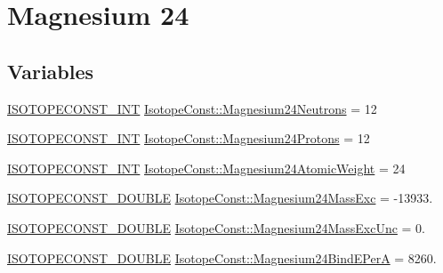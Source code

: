 \hypertarget{group___isotope_const-_magnesium-_mg24}{}\section{Magnesium 24}
\label{group___isotope_const-_magnesium-_mg24}
\subsection*{Variables}
\begin{DoxyCompactItemize}
\item 
\mbox{\hyperlink{group___isotope_const-_macros_ga5f18360b3e99483a35c32d789e62621c}{I\+S\+O\+T\+O\+P\+E\+C\+O\+N\+S\+T\+\_\+\+I\+NT}} \mbox{\hyperlink{group___isotope_const-_magnesium-_mg24_ga85c0d5a9a8139d8fe95ed02cc2f025bc}{Isotope\+Const\+::\+Magnesium24\+Neutrons}} = 12
\item 
\mbox{\hyperlink{group___isotope_const-_macros_ga5f18360b3e99483a35c32d789e62621c}{I\+S\+O\+T\+O\+P\+E\+C\+O\+N\+S\+T\+\_\+\+I\+NT}} \mbox{\hyperlink{group___isotope_const-_magnesium-_mg24_ga5b6c944e7f5d375c84a0c69d66051458}{Isotope\+Const\+::\+Magnesium24\+Protons}} = 12
\item 
\mbox{\hyperlink{group___isotope_const-_macros_ga5f18360b3e99483a35c32d789e62621c}{I\+S\+O\+T\+O\+P\+E\+C\+O\+N\+S\+T\+\_\+\+I\+NT}} \mbox{\hyperlink{group___isotope_const-_magnesium-_mg24_ga11e616b03d38bb11561084c6d6368569}{Isotope\+Const\+::\+Magnesium24\+Atomic\+Weight}} = 24
\item 
\mbox{\hyperlink{group___isotope_const-_macros_ga8f45a7272ce02c0b4c65c44636ed719a}{I\+S\+O\+T\+O\+P\+E\+C\+O\+N\+S\+T\+\_\+\+D\+O\+U\+B\+LE}} \mbox{\hyperlink{group___isotope_const-_magnesium-_mg24_ga892bbc57bb25200d840a534b03dd3cb8}{Isotope\+Const\+::\+Magnesium24\+Mass\+Exc}} = -\/13933.
\item 
\mbox{\hyperlink{group___isotope_const-_macros_ga8f45a7272ce02c0b4c65c44636ed719a}{I\+S\+O\+T\+O\+P\+E\+C\+O\+N\+S\+T\+\_\+\+D\+O\+U\+B\+LE}} \mbox{\hyperlink{group___isotope_const-_magnesium-_mg24_ga1f201d6c66be1b144554aa6cb5fcae29}{Isotope\+Const\+::\+Magnesium24\+Mass\+Exc\+Unc}} = 0.
\item 
\mbox{\hyperlink{group___isotope_const-_macros_ga8f45a7272ce02c0b4c65c44636ed719a}{I\+S\+O\+T\+O\+P\+E\+C\+O\+N\+S\+T\+\_\+\+D\+O\+U\+B\+LE}} \mbox{\hyperlink{group___isotope_const-_magnesium-_mg24_gae60ed68de49c36f76976b30f473c9a19}{Isotope\+Const\+::\+Magnesium24\+Bind\+E\+PerA}} = 8260.
\item 

\end{DoxyCompactItemize}
